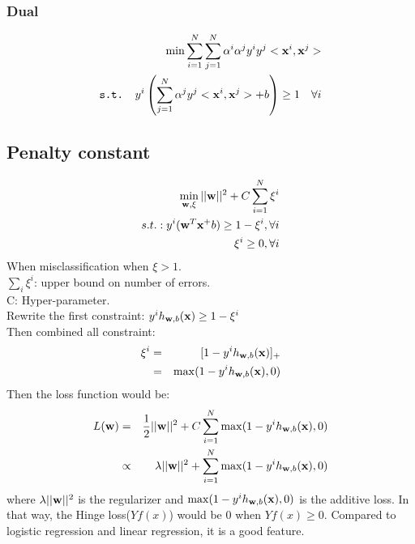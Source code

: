 \documentclass[12pt,a4paper]{article}
\begin{document}
\subsubsection*{Dual}
\begin{eqnarray*}
\min \sum_{i=1}^{N}\sum_{j=1}^{N}\alpha^i\alpha^jy^iy^j<{\bf x}^i,{\bf x}^j> \\
\texttt{s.t. } y^i\left(\sum_{j=1}^{N}\alpha^jy^j<{\bf x}^i,{\bf x}^j>+b \right)\ge 1  \quad  \forall i
\end{eqnarray*}
\subsection*{Penalty constant}
\begin{eqnarray*}
\min_{{\bf w},\xi} ||{\bf w}||^2+C\sum_{i=1}^{N}\xi^i\\
s.t.: y^i({\bf w}^T{\bf x}^+b)\ge 1-\xi^i, \forall i\\
\xi^i\ge0, \forall i
\end{eqnarray*}
When misclassification when $\xi >1$.\\
$\sum_i\xi^i$: upper bound on number of errors. \\
C: Hyper-parameter.\\
Rewrite the first constraint: $y^ih_{{\bf w},b}({\bf x})\ge 1-\xi^i$ \\
Then combined all constraint:
\begin{eqnarray*}
\xi^i &=& [1-y^ih_{{\bf w},b}({\bf x})]_+\\
&=& \max(1-y^ih_{{\bf w},b}({\bf x}),0)
\end{eqnarray*}
Then the loss function would be:
\begin{eqnarray*}
L({\bf w})&=& \frac{1}{2}||{\bf w}||^2+C\sum_{i=1}^N \max(1-y^ih_{{\bf w},b}({\bf x}),0) \\
 &\propto& \lambda ||{\bf w}||^2+\sum_{i=1}^{N}\max(1-y^ih_{{\bf w},b}({\bf x}),0)
\end{eqnarray*}
where $\lambda||{\bf w}||^2$ is the regularizer and $\max(1-y^ih_{{\bf w},b}({\bf x}),0)$ is the additive loss. In that way, the Hinge loss($Yf(x)$) would be 0 when $Yf(x)\ge 0$. Compared to logistic regression and linear regression, it is a good feature.
\end{document}
